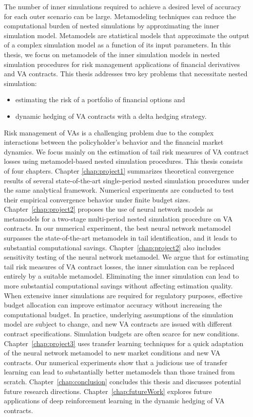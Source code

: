 The number of inner simulations required to achieve a desired level of accuracy for each outer scenario can be large.
Metamodeling techniques can reduce the computational burden of nested simulations by approximating the inner simulation model.
Metamodels are statistical models that approximate the output of a complex simulation model as a function of its input parameters.
In this thesis, we focus on metamodels of the inner simulation models in nested simulation procedures for risk management applications of financial derivatives and VA contracts.
This thesis addresses two key problems that necessitate nested simulation:
\begin{itemize}
    \item estimating the risk of a portfolio of financial options and 
    \item dynamic hedging of VA contracts with a delta hedging strategy.
\end{itemize}
Risk management of VAs is a challenging problem due to the complex interactions between the policyholder's behavior and the financial market dynamics.
We focus mainly on the estimation of tail risk measures of VA contract losses using metamodel-based nested simulation procedures.
This thesis consists of four chapters.
Chapter \ref{chap:project1} summarizes theoretical convergence results of several state-of-the-art single-period nested simulation procedures under the same analytical framework.
Numerical experiments are conducted to test their empirical convergence behavior under finite budget sizes.
Chapter~\ref{chap:project2} proposes the use of neural network models as metamodels for a two-stage multi-period nested simulation procedure on VA contracts.
In our numerical experiment, the best neural network metamodel surpasses the state-of-the-art metamodels in tail identification, and it leads to substantial computational savings.
Chapter~\ref{chap:project2} also includes sensitivity testing of the neural network metamodel.
We argue that for estimating tail risk measures of VA contract losses, the inner simulation can be replaced entirely by a suitable metamodel.
Eliminating the inner simulation can lead to more substantial computational savings without affecting estimation quality.
When extensive inner simulations are required for regulatory purposes, effective budget allocation can improve estimator accuracy without increasing the computational budget.
In practice, underlying assumptions of the simulation model are subject to change, and new VA contracts are issued with different contract specifications.
Simulation budgets are often scarce for new conditions.
Chapter~\ref{chap:project3} uses transfer learning techniques for a quick adaptation of the neural network metamodel to new market conditions and new VA contracts.
Our numerical experiments show that a judicious use of transfer learning can lead to substantially better metamodels than those trained from scratch.
Chapter~\ref{chap:conclusion} concludes this thesis and discusses potential future research directions.
Chapter~\ref{chap:futureWork} explores future applications of deep reinforcement learning in the dynamic hedging of VA contracts.


